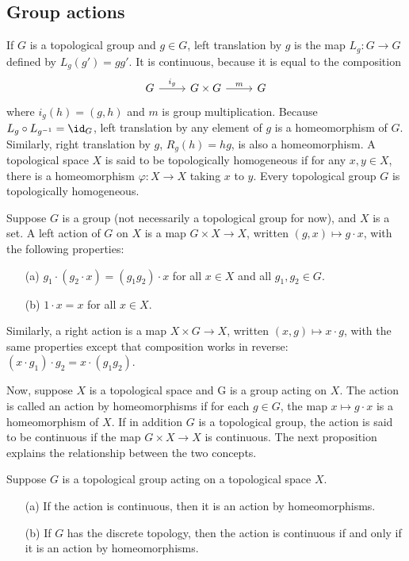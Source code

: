 \subsection{Group actions}
If $G$ is a topological group and $g\in G$, left translation by $g$ is the map $L_g:G\to G$ defined by $L_g(g')=gg'$. It is continuous, because it is equal to the composition
\[\begin{tikzcd}
G\ar[,r,"i_g"] & G\times G\ar[,r,"m"] &G
\end{tikzcd}\]
where $i_g(h)=(g,h)$ and $m$ is group multiplication. Because $L_g\circ L_{g^{-1}}=\id_G$, left translation by any element of $g$ is a homeomorphism of $G$. Similarly, right translation by $g$, $R_g(h)=hg$, is also a homeomorphism. A topological space $X$ is said to be topologically homogeneous if for any $x,y\in  X$, there is a homeomorphism $\varphi:X\to X$ taking $x$ to $y$. Every topological group $G$ is topologically homogeneous.
\begin{definition}
Suppose $G$ is a group (not necessarily a topological group for now), and $X$ is a set. A left action of $G$ on $X$ is a map $G\times X\to X$, written $(g,x)\mapsto g\cdot x$, with the
following properties:
\begin{itemize}
\item[(a)] $g_1\cdot (g_2\cdot x)=(g_1g_2)\cdot x$ for all $x\in X$ and all $g_1,g_2\in G$.
\item[(b)] $1\cdot x=x$ for all $x\in X$.
\end{itemize}
Similarly, a right action is a map $X\times G\to X$, written $(x,g)\mapsto x\cdot g$, with the same properties except that composition works in reverse: $(x\cdot g_1)\cdot g_2=x\cdot(g_1g_2)$.
\end{definition}
Now, suppose $X$ is a topological space and G is a group acting on $X$. The action is called an action by homeomorphisms if for each $g\in G$, the map $x\mapsto g\cdot x$ is a homeomorphism of $X$. If in addition $G$ is a topological group, the action is said to be continuous if the map
$G\times X\to X$ is continuous. The next proposition explains the relationship between the two concepts.
\begin{proposition}
Suppose $G$ is a topological group acting on a topological space $X$.
\begin{itemize}
\item[(a)] If the action is continuous, then it is an action by homeomorphisms.
\item[(b)] If $G$ has the discrete topology, then the action is continuous if and only if it is an action by homeomorphisms.
\end{itemize}
\end{proposition}
